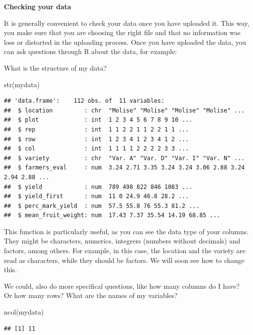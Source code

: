\documentclass[
]{book}
\newenvironment{Shaded}{\begin{snugshade}}{\end{snugshade}}
\newcommand{\FunctionTok}[1]{\textcolor[rgb]{0.00,0.00,0.00}{#1}}
\newcommand{\NormalTok}[1]{#1}
\begin{document}
\textbf{Checking your data }

It is generally convenient to check your data once you have uploaded it. This way, you make sure that you are choosing the right file and that no information was loss or distorted in the uploading process. Once you have uploaded the data, you can ask questions through R about the data, for example:

What is the structure of my data?

\begin{Shaded}
\begin{Highlighting}[]
\FunctionTok{str}\NormalTok{(mydata)}
\end{Highlighting}
\end{Shaded}

\begin{verbatim}
## 'data.frame':    112 obs. of  11 variables:
##  $ location         : chr  "Molise" "Molise" "Molise" "Molise" ...
##  $ plot             : int  1 2 3 4 5 6 7 8 9 10 ...
##  $ rep              : int  1 1 2 2 1 1 2 2 1 1 ...
##  $ row              : int  1 2 3 4 1 2 3 4 1 2 ...
##  $ col              : int  1 1 1 1 2 2 2 2 3 3 ...
##  $ variety          : chr  "Var. A" "Var. D" "Var. I" "Var. N" ...
##  $ farmers_eval     : num  3.24 2.71 3.35 3.24 3.24 3.06 2.88 3.24 2.94 2.88 ...
##  $ yield            : num  789 498 822 846 1083 ...
##  $ yield_first      : num  11 0 24.9 46.8 28.2 ...
##  $ perc_mark_yield  : num  57.5 55.8 76 55.3 81.2 ...
##  $ mean_fruit_weight: num  17.43 7.37 35.54 14.19 68.85 ...
\end{verbatim}

This function is particularly useful, as you can see the data type of your columns. They might be characters, numerics, integrers (numbers without decimals) and factors, among others. For example, in this case, the location and the variety are read as characters, while they should be factors. We will soon see how to change this.

We could, also do more specifical questions, like how many columns do I have? Or how many rows? What are the names of my variables?

\begin{Shaded}
\begin{Highlighting}[]
\FunctionTok{ncol}\NormalTok{(mydata)}
\end{Highlighting}
\end{Shaded}

\begin{verbatim}
## [1] 11
\end{verbatim}
\end{document}

